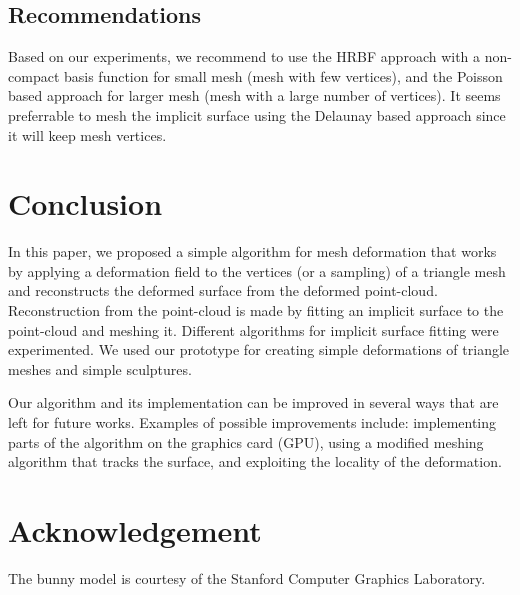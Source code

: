 \documentclass[ams]{U-AizuGT}
\begin{document}
\subsection{Recommendations}
Based on our experiments, we recommend to use the HRBF approach with a non-compact basis function 
for small mesh (mesh with few vertices), and the Poisson based approach for larger mesh (mesh with 
a large number of vertices). 
It seems preferrable to mesh the implicit surface using the Delaunay based approach since it will keep 
mesh vertices. 


\section{Conclusion}
In this paper, we proposed a simple algorithm for mesh deformation that works by applying a deformation field to the vertices (or a sampling) of a triangle mesh and reconstructs the deformed surface from the deformed point-cloud.
Reconstruction from the point-cloud is made by fitting an implicit surface to the point-cloud and meshing it.
Different algorithms for implicit surface fitting were experimented. 
We used our prototype for creating simple deformations of triangle meshes and simple sculptures. 

Our algorithm and its implementation can be improved in several ways that are left for future works.
Examples of possible improvements include:  
implementing parts of the algorithm on the graphics card (GPU), using a modified meshing algorithm that tracks the surface, and exploiting the locality of the deformation. 


\section*{Acknowledgement}
The bunny model is courtesy of the Stanford Computer Graphics Laboratory.




\end{document}
